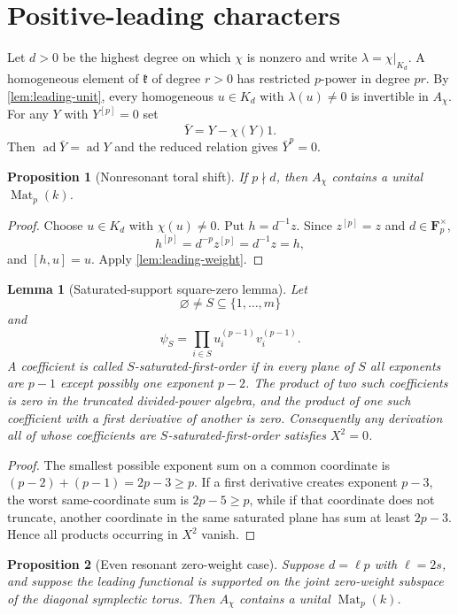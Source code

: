\documentclass[11pt,reqno]{amsart}
\newtheorem{proposition}[proposition]{Proposition}
\newtheorem{lemma}[lemma]{Lemma}
\theoremstyle{definition}
\theoremstyle{remark}
\theoremstyle{definition}
\newcommand{\kk}{\mathfrak{k}}
\newcommand{\Achi}{A_{\chi}}
\newcommand{\Mat}{\operatorname{Mat}}
\newcommand{\ad}{\operatorname{ad}}
\newcommand{\Fp}{\mathbf F_p}
\begin{document}
\section{Positive-leading characters}\label{sec:positive}

Let $d>0$ be the highest degree on which $\chi$ is nonzero and write
$\lambda=\chi|_{K_d}$.  A homogeneous element of $\kk$ of degree $r>0$
has restricted $p$-power in degree $pr$.  By \cref{lem:leading-unit},
every homogeneous $u\in K_d$ with $\lambda(u)\ne0$ is invertible in
$\Achi$.  For any $Y$ with $Y^{[p]}=0$ set
\[
 \bar Y=Y-\chi(Y)1.
\]
Then $\ad\bar Y=\ad Y$ and the reduced relation gives $\bar Y^p=0$.

\begin{proposition}[Nonresonant toral shift]\label{prop:positive-nonres}
If $p\nmid d$, then $\Achi$ contains a unital $\Mat_p(k)$.
\end{proposition}

\begin{proof}
Choose $u\in K_d$ with $\chi(u)\ne0$.
Put $h=d^{-1}z$.  Since $z^{[p]}=z$ and $d\in\Fp^\times$,
\[
 h^{[p]}=d^{-p}z^{[p]}=d^{-1}z=h,
\]
and $[h,u]=u$.  Apply \cref{lem:leading-weight}.
\end{proof}

\begin{lemma}[Saturated-support square-zero lemma]\label{lem:saturated}
Let
\[
 \varnothing\ne S\subseteq\{1,\ldots,m\}
\]
and
\[
 \psi_S=\prod_{i\in S}u_i^{(p-1)}v_i^{(p-1)}.
\]
A coefficient is called $S$-saturated-first-order if in every plane of $S$
all exponents are $p-1$ except possibly one exponent $p-2$.  The product of
two such coefficients is zero in the truncated divided-power algebra, and
the product of one such coefficient with a first derivative of another is
zero.  Consequently any derivation all of whose coefficients are
$S$-saturated-first-order satisfies $X^2=0$.
\end{lemma}

\begin{proof}
The smallest possible exponent sum on a common coordinate is
$(p-2)+(p-1)=2p-3\ge p$.  If a first derivative creates exponent $p-3$,
the worst same-coordinate sum is $2p-5\ge p$, while if that coordinate does
not truncate, another coordinate in the same saturated plane has sum at
least $2p-3$.  Hence all products occurring in $X^2$ vanish.
\end{proof}

\begin{proposition}[Even resonant zero-weight case]\label{prop:even-resonant}
Suppose $d=\ell p$ with $\ell=2s$, and suppose the leading functional is supported
on the joint zero-weight subspace of the diagonal symplectic torus.  Then
$\Achi$ contains a unital $\Mat_p(k)$.
\end{proposition}
\end{document}
